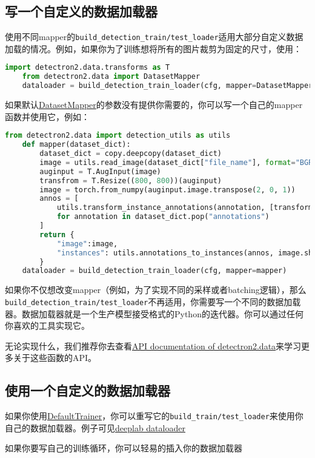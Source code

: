 \documentclass[../main.tex]{subfile}
\begin{document}
\subsection{写一个自定义的数据加载器}

使用不同mapper的\lstinline{build_detection_train/test_loader}适用大部分自定义数据加载的情况。例如，如果你为了训练想将所有的图片裁剪为固定的尺寸，使用：

\begin{lstlisting}[language=Python]
    import detectron2.data.transforms as T
    from detectron2.data import DatasetMapper
    dataloader = build_detection_train_loader(cfg, mapper=DatasetMapper(cfg, is_train=True, augmentations=[T.Reszie((800, 800))]))
\end{lstlisting}

如果默认\href{https://detectron2.readthedocs.io/en/latest/modules/data.html#detectron2.data.DatasetMapper}{DatasetMapper}的参数没有提供你需要的，你可以写一个自己的mapper函数并使用它，例如：

\begin{lstlisting}[language=Python]
    from detectron2.data import detection_utils as utils
    def mapper(dataset_dict):
        dataset_dict = copy.deepcopy(dataset_dict)
        image = utils.read_image(dataset_dict["file_name"], format="BGR")
        auginput = T.AugInput(image)
        transfrom = T.Resize((800, 800))(auginput)
        image = torch.from_numpy(auginput.image.transpose(2, 0, 1))
        annos = [
            utils.transform_instance_annotations(annotation, [transform], image.shape[1:])
            for annotation in dataset_dict.pop("annotations")    
        ]
        return {
            "image":image,
            "instances": utils.annotations_to_instances(annos, image.shape[1:])
        }
    dataloader = build_detection_train_loader(cfg, mapper=mapper)
\end{lstlisting}

如果你不仅想改变mapper（例如，为了实现不同的采样或者batching逻辑），那么\lstinline{build_detection_train/test_loader}不再适用，你需要写一个不同的数据加载器。数据加载器就是一个生产模型接受格式的Python的迭代器。你可以通过任何你喜欢的工具实现它。

无论实现什么，我们推荐你去查看\href{https://detectron2.readthedocs.io/en/latest/modules/data.html}{API documentation of detectron2.data}来学习更多关于这些函数的API。

\subsection{使用一个自定义的数据加载器}

如果你使用\href{https://detectron2.readthedocs.io/en/latest/modules/engine.html#detectron2.engine.defaults.DefaultTrainer}{DefaultTrainer}，你可以重写它的\lstinline{build_train/test_loader}来使用你自己的数据加载器。例子可见\href{https://github.com/facebookresearch/detectron2/blob/master/projects/DeepLab/train_net.py}{deeplab dataloader}

如果你要写自己的训练循环，你可以轻易的插入你的数据加载器
\end{document}
